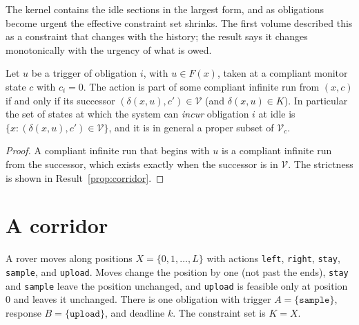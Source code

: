 The kernel contains the idle sections in the largest form, and as obligations become urgent the effective constraint set shrinks. The first volume described this as a constraint that changes with the history; the result says it changes monotonically with the urgency of what is owed.

\begin{newresult}\label{cor:trigger}
Let $u$ be a trigger of obligation $i$, with $u\in F(x)$, taken at a compliant monitor state $c$ with $c_i=0$. The action is part of some compliant infinite run from $(x,c)$ if and only if its successor $(\delta(x,u),c')\in\mathcal V$ (and $\delta(x,u)\in K$). In particular the set of states at which the system can \emph{incur} obligation $i$ at idle is $\{x:(\delta(x,u),c')\in\mathcal V\}$, and it is in general a proper subset of $\mathcal V_c$.
\end{newresult}
\begin{proof}
A compliant infinite run that begins with $u$ is a compliant infinite run from the successor, which exists exactly when the successor is in $\mathcal V$. The strictness is shown in Result~\ref{prop:corridor}.
\end{proof}

\section{A corridor}

\begin{example}\label{ex:corridor}
A rover moves along positions $X=\{0,1,\dots,L\}$ with actions \texttt{left}, \texttt{right}, \texttt{stay}, \texttt{sample}, and \texttt{upload}. Moves change the position by one (not past the ends), \texttt{stay} and \texttt{sample} leave the position unchanged, and \texttt{upload} is feasible only at position $0$ and leaves it unchanged. There is one obligation with trigger $A=\{\texttt{sample}\}$, response $B=\{\texttt{upload}\}$, and deadline $k$. The constraint set is $K=X$.
\end{example}

